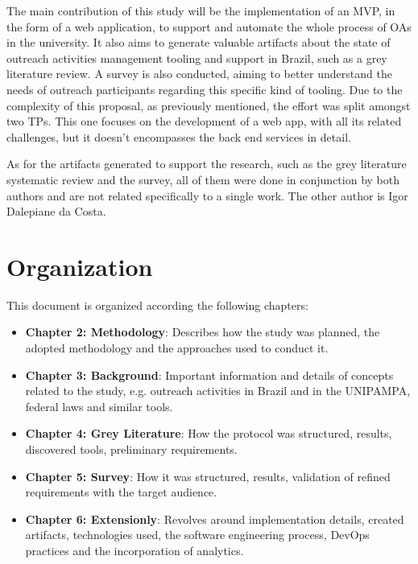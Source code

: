 The main contribution of this study will be the implementation of an \ac{MVP}, in the form of a web application, to support and automate the whole process of \acp{OA} in the university. It also aims to generate valuable artifacts about the state of outreach activities management tooling and support in Brazil, such as a grey literature review. A survey is also conducted, aiming to better understand the needs of outreach participants regarding this specific kind of tooling. Due to the complexity of this proposal, as previously mentioned, the effort was split amongst two \acp{TP}. This one focuses on the development of a web app, with all its related challenges, but it doesn't encompasses the back end services in detail.

As for the artifacts generated to support the research, such as the grey literature systematic review and the survey, all of them were done in conjunction by both authors and are not related specifically to a single work. The other author is Igor Dalepiane da Costa.

\section{Organization}\label{sec:organization}

This document is organized according the following chapters:

\begin{itemize}
  \item \textbf{Chapter 2: Methodology}: Describes how the study was planned, the adopted methodology and the approaches used to conduct it.
  \item \textbf{Chapter 3: Background}: Important information and details of concepts related to the study, e.g. outreach activities in Brazil and in the \acl{UNIPAMPA}, federal laws and similar tools.
  \item \textbf{Chapter 4: Grey Literature}: How the protocol was structured, results, discovered tools, preliminary requirements.
  \item \textbf{Chapter 5: Survey}: How it was structured, results, validation of refined requirements with the target audience.
  \item \textbf{Chapter 6: Extensionly}: Revolves around implementation details, created artifacts, technologies used, the software engineering process, DevOps practices and the incorporation of analytics.
\end{itemize}
